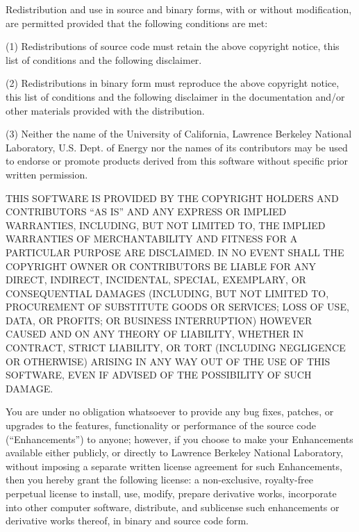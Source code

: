 \documentclass[letterpaper,10pt,english,openany]{sphinxmanual}
\begin{document}
Redistribution and use in source and binary forms, with or without
modification, are permitted provided that the following conditions are met:

(1) Redistributions of source code must retain the above copyright notice,
this list of conditions and the following disclaimer.

(2) Redistributions in binary form must reproduce the above copyright
notice, this list of conditions and the following disclaimer in the
documentation and/or other materials provided with the distribution.

(3) Neither the name of the University of California, Lawrence Berkeley
National Laboratory, U.S. Dept. of Energy nor the names of its contributors
may be used to endorse or promote products derived from this software
without specific prior written permission.

THIS SOFTWARE IS PROVIDED BY THE COPYRIGHT HOLDERS AND CONTRIBUTORS “AS IS”
AND ANY EXPRESS OR IMPLIED WARRANTIES, INCLUDING, BUT NOT LIMITED TO, THE
IMPLIED WARRANTIES OF MERCHANTABILITY AND FITNESS FOR A PARTICULAR PURPOSE
ARE DISCLAIMED. IN NO EVENT SHALL THE COPYRIGHT OWNER OR CONTRIBUTORS BE
LIABLE FOR ANY DIRECT, INDIRECT, INCIDENTAL, SPECIAL, EXEMPLARY, OR
CONSEQUENTIAL DAMAGES (INCLUDING, BUT NOT LIMITED TO, PROCUREMENT OF
SUBSTITUTE GOODS OR SERVICES; LOSS OF USE, DATA, OR PROFITS; OR BUSINESS
INTERRUPTION) HOWEVER CAUSED AND ON ANY THEORY OF LIABILITY, WHETHER IN
CONTRACT, STRICT LIABILITY, OR TORT (INCLUDING NEGLIGENCE OR OTHERWISE)
ARISING IN ANY WAY OUT OF THE USE OF THIS SOFTWARE, EVEN IF ADVISED OF THE
POSSIBILITY OF SUCH DAMAGE.

You are under no obligation whatsoever to provide any bug fixes, patches,
or upgrades to the features, functionality or performance of the source
code (“Enhancements”) to anyone; however, if you choose to make your
Enhancements available either publicly, or directly to Lawrence Berkeley
National Laboratory, without imposing a separate written license agreement
for such Enhancements, then you hereby grant the following license: a
non-exclusive, royalty-free perpetual license to install, use, modify,
prepare derivative works, incorporate into other computer software,
distribute, and sublicense such enhancements or derivative works thereof,
in binary and source code form.
\end{document}
